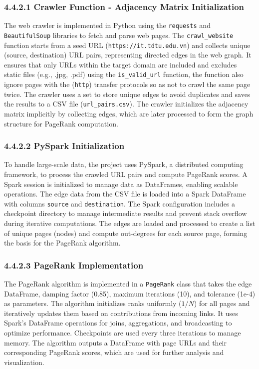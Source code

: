 \documentclass{article}
\begin{document}
\subsubsection*{4.4.2.1 Crawler Function - Adjacency Matrix Initialization}

The web crawler is implemented in Python using the \texttt{requests} and \texttt{BeautifulSoup} libraries to fetch and parse web pages. The \texttt{crawl\_website} function starts from a seed URL (\texttt{https://it.tdtu.edu.vn}) and collects unique (source, destination) URL pairs, representing directed edges in the web graph. It ensures that only URLs within the target domain are included and excludes static files (e.g., .jpg, .pdf) using the \texttt{is\_valid\_url} function, the function also ignore pages with the (\texttt{http}) transfer protocols so as not to crawl the same page twice. The crawler uses a set to store unique edges to avoid duplicates and saves the results to a CSV file (\texttt{url\_pairs.csv}). The crawler initializes the adjacency matrix implicitly by collecting edges, which are later processed to form the graph structure for PageRank computation.

\subsubsection*{4.4.2.2 PySpark Initialization}

To handle large-scale data, the project uses PySpark, a distributed computing framework, to process the crawled URL pairs and compute PageRank scores. A Spark session is initialized to manage data as DataFrames, enabling scalable operations. The edge data from the CSV file is loaded into a Spark DataFrame with columns \texttt{source} and \texttt{destination}. The Spark configuration includes a checkpoint directory to manage intermediate results and prevent stack overflow during iterative computations. The edges are loaded and processed to create a list of unique pages (nodes) and compute out-degrees for each source page, forming the basis for the PageRank algorithm.

\subsubsection*{4.4.2.3 PageRank Implementation}

The PageRank algorithm is implemented in a \texttt{PageRank} class that takes the edge DataFrame, damping factor (0.85), maximum iterations (10), and tolerance (1e-4) as parameters. The algorithm initializes ranks uniformly (\( 1/N \)) for all pages and iteratively updates them based on contributions from incoming links. It uses Spark's DataFrame operations for joins, aggregations, and broadcasting to optimize performance. Checkpoints are used every three iterations to manage memory. The algorithm outputs a DataFrame with page URLs and their corresponding PageRank scores, which are used for further analysis and visualization.
\end{document}
